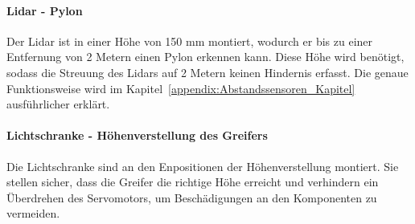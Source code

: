 \documentclass[main.tex]{subfiles} %
\begin{document}
\paragraph{Lidar - Pylon}
Der Lidar ist in einer Höhe von 150 mm montiert, wodurch er bis zu einer Entfernung
von 2 Metern einen Pylon erkennen kann. Diese Höhe wird benötigt, sodass die Streuung des Lidars auf 2 Metern keinen
Hindernis erfasst. Die genaue Funktionsweise wird im Kapitel~\ref{appendix:Abstandssensoren_Kapitel} ausführlicher erklärt.

\paragraph{Lichtschranke - Höhenverstellung des Greifers}

Die Lichtschranke sind an den Enpositionen der Höhenverstellung montiert.
Sie stellen sicher, dass die Greifer die richtige Höhe erreicht und verhindern
ein Überdrehen des Servomotors, um Beschädigungen an den Komponenten zu vermeiden.
\end{document}
